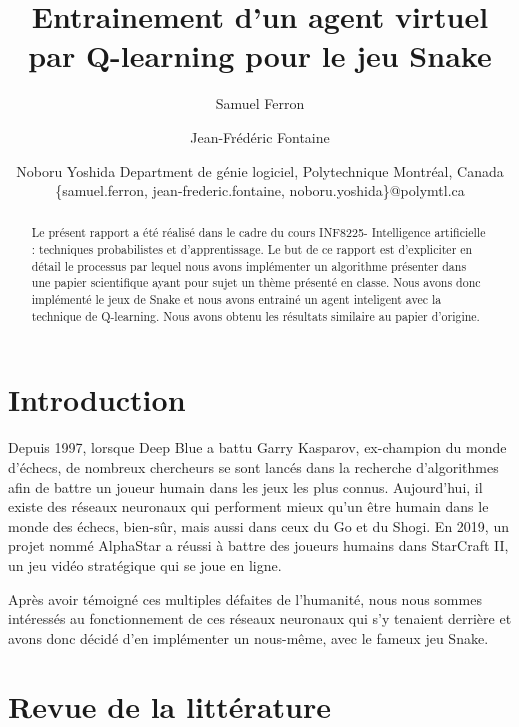 \documentclass{article}
\title{Entrainement d'un agent virtuel par Q-learning pour le jeu Snake}
\author{
Samuel Ferron\and
Jean-Frédéric Fontaine\and
Noboru Yoshida
\affiliations
Department de génie logiciel, Polytechnique Montréal, Canada\\
\emails
\{samuel.ferron, jean-frederic.fontaine, noboru.yoshida\}@polymtl.ca
}
\begin{document}
\maketitle

\begin{abstract}
Le présent rapport a été réalisé dans le cadre du cours INF8225- Intelligence artificielle : techniques probabilistes et d’apprentissage. Le but de ce rapport est d'expliciter en détail le processus par lequel nous avons implémenter un algorithme présenter dans une papier scientifique ayant pour sujet un thème présenté en classe. Nous avons donc implémenté le jeux de Snake et nous avons entrainé un agent inteligent avec la technique de Q-learning. Nous avons obtenu les résultats similaire au papier d'origine. 
\end{abstract}

\section{Introduction}

Depuis 1997, lorsque Deep Blue a battu Garry Kasparov, ex-champion du monde d’échecs, de nombreux chercheurs se sont lancés dans la recherche d’algorithmes afin de battre un joueur humain dans les jeux les plus connus. Aujourd’hui, il existe des réseaux neuronaux qui performent mieux qu’un être humain dans le monde des échecs, bien-sûr, mais aussi dans ceux du Go et du Shogi. En 2019, un projet nommé AlphaStar a réussi à battre des joueurs humains dans StarCraft II, un jeu vidéo stratégique qui se joue en ligne.\linebreak

Après avoir témoigné ces multiples défaites de l’humanité, nous nous sommes intéressés au fonctionnement de ces réseaux neuronaux qui s’y tenaient derrière et avons donc décidé d’en implémenter un nous-même, avec le fameux jeu Snake.

\section{Revue de la littérature}
 
\end{document}
